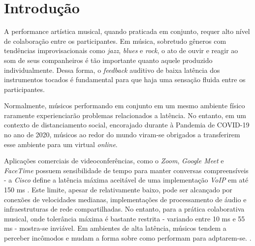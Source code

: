 \chapter{Introdução}

A performance artística musical, quando praticada em conjunto, requer alto nível de colaboração entre os participantes. Em música, sobretudo gêneros com tendências improvisacionais como \textit{jazz}, \textit{blues} e \textit{rock}, o ato de ouvir e reagir ao som de seus companheiros é tão importante quanto aquele produzido individualmente. Dessa forma, o \textit{feedback} auditivo de baixa latência dos instrumentos tocados é fundamental para que haja uma sensação fluida entre os participantes.

Normalmente, músicos performando em conjunto em um mesmo ambiente físico raramente experienciarão problemas relacionados a latência. No entanto, em um contexto de distanciamento social, encorajado durante à Pandemia de COVID-19 no ano de 2020, músicos ao redor do mundo viram-se obrigados a transferirem esse ambiente para um virtual \textit{online}.


Aplicações comerciais de videoconferências, como o \textit{Zoom}, \textit{Google Meet} e \textit{FaceTime}  possuem sensibilidade de tempo para manter conversas compreensíveis - a \textit{Cisco} define a latência máxima aceitável de uma implementação \textit{VoIP} em até 150 ms \cite{cisco}. Este limite, apesar de relativamente baixo, pode ser alcançado por conexões de velocidades medianas, implementações de processamento de áudio e infraestruturas de rede compartilhadas. No entanto, para a prática colaborativa musical, onde tolerância máxima é bastante restrita - variando entre 10 ms e 55 ms \cite{mcphearson} - mostra-se inviável. Em ambientes de alta latência, músicos tendem a perceber incômodos e mudam a forma sobre como performam para adptarem-se. \cite{carot_low_latency}.

